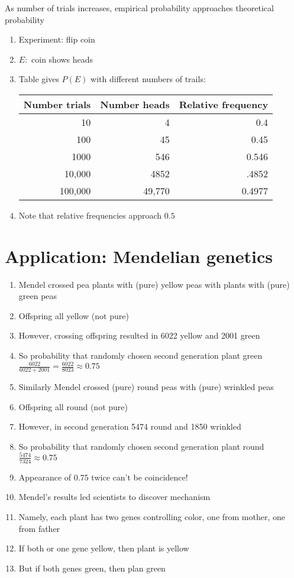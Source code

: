 \documentclass{ximera}
\begin{document}
\begin{theorem}
As number of trials increases, empirical probability
approaches theoretical probability
\end{theorem}

\begin{example}
\begin{enumerate}
\item Experiment: flip coin
\item $E:$ coin shows heads
\item Table gives $P\left(E\right)$ with different numbers of trails:
\begin{center}\begin{tabular}{rrr}
Number trials&Number heads&Relative frequency\\\toprule
10&4&0.4\\
100&45&0.45\\
1000&546&0.546\\
10,000&4852&.4852\\
100,000&49,770&0.4977
\end{tabular}\end{center}
\item Note that relative frequencies approach $0.5$
\end{enumerate}
\end{example}

\section{Application: Mendelian genetics}
\begin{enumerate}
\item Mendel crossed pea plants with (pure) yellow peas
with plants with (pure) green peas
\item Offspring all yellow (not pure)
\item However, crossing offspring resulted in 
6022 yellow and 2001 green
\item So probability that randomly chosen second generation plant green
$\frac{6022}{6022+2001}=\frac{6022}{8023}\approx 0.75$
\item Similarly Mendel crossed (pure) round peas with (pure) wrinkled peas
\item Offspring all round (not pure)
\item However, in second generation 5474 round and 1850 wrinkled
\item So probability that randomly chosen second generation plant round
$\frac{5474}{7324}\approx 0.75$
\item Appearance of $0.75$ twice can't be coincidence!
\item Mendel's results led scientists to discover mechanism
\item Namely, each plant has two genes controlling color, one
from mother, one from father
\item If both or one gene yellow, then plant is yellow
\item But if both genes green, then plan green
\end{enumerate}
\end{document}
